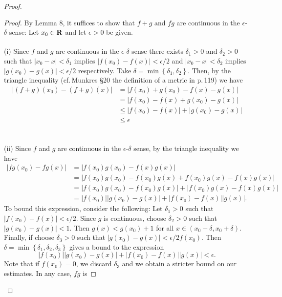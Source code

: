 \begin{proof}
\begin{lemma}
\begin{enumerate}[noitemsep,label=(\roman*)]
\end{enumerate}
\end{lemma}
\begin{proof}
\renewcommand\qedsymbol{$\clubsuit$}
By Lemma 8, it suffices to show that $f+g$ and $fg$ are
continuous in the $\epsilon$-$\delta$ sense: Let $x_0\in\mathbf{R}$ and
let $\epsilon>0$ be given.
\\\\
(i) Since $f$ and $g$ are continuous in the $\epsilon$-$\delta$
sense there exists $\delta_1>0$ and $\delta_2>0$ such that
$|x_0-x|<\delta_1$ implies $\left|f(x_0)-f(x)\right|<\epsilon/2$
and $|x_0-x|<\delta_2$ implies $\left|g(x_0)-g(x)\right|<\epsilon/2$
respectively. Take
$\delta=\min\left\{\delta_1,\delta_2\right\}$. Then, by the
triangle inequality (cf.\,Munkres \S20 the definition of a metric
in p.\,119) we have
\begin{align*}
\left|(f+g)(x_0)-(f+g)(x)\right|
&=\left|f(x_0)+g(x_0)-f(x)-g(x)\right|
\\
&=\left|f(x_0)-f(x)+g(x_0)-g(x)\right|
\\
&\leq
\left|f(x_0)-f(x)\right|+\left|g(x_0)-g(x)\right|\\
&\leq \epsilon
\end{align*}
\\\\
(ii) Since $f$ and $g$ are continuous in the $\epsilon$-$\delta$
sense, by the triangle inequality we have
\begin{align*}
\left|fg(x_0)-fg(x)\right|
&=\left|f(x_0)g(x_0)-f(x)g(x)\right|
\\
&=\left|f(x_0)g(x_0)-f(x_0)g(x)+f(x_0)g(x)-f(x)g(x)\right|\\
&=\left|f(x_0)g(x_0)-f(x_0)g(x)\right|
+\left|f(x_0)g(x)-f(x)g(x)\right|\\
&=
\left|f(x_0)\right|
\left|g(x_0)-g(x)\right|
+\left|f(x_0)-f(x)\right|
\left|g(x)\right|.
\end{align*}
To bound this expression, consider the following: Let
$\delta_1>0$ such that
$\left|f(x_0)-f(x)\right|<\epsilon/2$. Since $g$ is continuous,
choose $\delta_2>0$ such that $\left|g(x_0)-g(x)\right|<1$. Then
$g(x)<g(x_0)+1$ for all $x\in(x_0-\delta,x_0+\delta)$. Finally,
if choose $\delta_3>0$ such that
$\left|g(x_0)-g(x)\right|<\epsilon/2f(x_0)$. Then
$\delta=\min\left\{\delta_1,\delta_2,\delta_3\right\}$ gives a
bound to the expression
\[
\left|f(x_0)\right|
\left|g(x_0)-g(x)\right|
+\left|f(x_0)-f(x)\right|
\left|g(x)\right|
<\epsilon.
\]
Note that if $f(x_0)=0$, we discard $\delta_3$ and we obtain a
stricter bound on our estimates. In any case, $fg$ is

\end{proof}
\end{proof}
